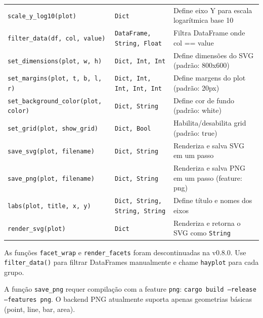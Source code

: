 \documentclass[12pt, a4paper, oneside]{book}
\newcommand{\code}[1]{\texttt{#1}}
\begin{document}
\begin{center}
\begin{tabularx}{\textwidth}{@{}L{4.8cm}L{4.0cm}X@{}}
    \code{scale\_y\_log10(plot)}                   & \code{Dict}                         & Define eixo Y para escala logarítmica base 10 \\[3pt]
    \code{filter\_data(df, col, value)}           & \code{DataFrame, String, Float}     & Filtra DataFrame onde col == value \\[3pt]
    \code{set\_dimensions(plot, w, h)}             & \code{Dict, Int, Int}               & Define dimensões do SVG (padrão: 800x600) \\[3pt]
    \code{set\_margins(plot, t, b, l, r)}          & \code{Dict, Int, Int, Int, Int}     & Define margens do plot (padrão: 20px) \\[3pt]
    \code{set\_background\_color(plot, color)}     & \code{Dict, String}                 & Define cor de fundo (padrão: white) \\[3pt]
    \code{set\_grid(plot, show\_grid)}               & \code{Dict, Bool}                   & Habilita/desabilita grid (padrão: true) \\[3pt]
    \code{save\_svg(plot, filename)}               & \code{Dict, String}                 & Renderiza e salva SVG em um passo \\[3pt]
    \code{save\_png(plot, filename)}               & \code{Dict, String}                 & Renderiza e salva PNG em um passo (feature: png) \\[3pt]
    \code{labs(plot, title, x, y)}                 & \code{Dict, String, String, String} & Define título e nomes dos eixos \\[3pt]
    \code{render\_svg(plot)}                       & \code{Dict}                         & Renderiza e retorna o SVG como \code{String} \\
    \bottomrule
  \end{tabularx}
\end{center}

\bigskip

\begin{alertbox}[title={\textbf{Nota:} Faceting descontinuado}]
  As funções \code{facet\_wrap} e \code{render\_facets} foram descontinuadas na v0.8.0.
  Use \code{filter\_data()} para filtrar DataFrames manualmente e chame \code{hayplot} para cada grupo.
\end{alertbox}

\bigskip

\begin{tipbox}[title={\textbf{Nota:} PNG export}]
  A função \code{save\_png} requer compilação com a feature \code{png}: \code{cargo build --release --features png}.
  O backend PNG atualmente suporta apenas geometrias básicas (point, line, bar, area).
\end{tipbox}
\end{document}
